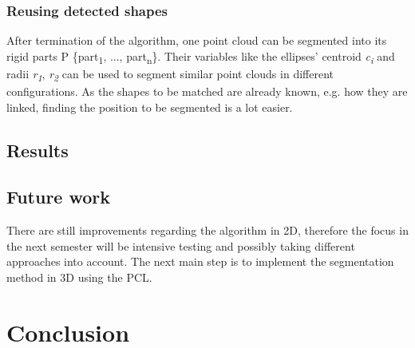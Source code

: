 \documentclass[a4paper,english,11pt]{report}
\begin{document}
\subsection{Reusing detected shapes}

After termination of the algorithm, one point cloud can be segmented into its rigid parts P \{part\textsubscript{1}, ..., part\textsubscript{n}\}. Their variables like the ellipses' centroid \textit{c\textsubscript{i}} and radii \textit{r\textsubscript{1}}, \textit{r\textsubscript{2}} can be used to segment similar point clouds in different configurations. As the shapes to be matched are already known, e.g. how they are linked, finding the position to be segmented is a lot easier.

\section{Results}

\section{Future work}

There are still improvements regarding the algorithm in 2D, therefore the focus in the next semester will be intensive testing and possibly taking different approaches into account. The next main step is to implement the segmentation method in 3D using the PCL. 





\chapter{Conclusion}



\MakeBibliography[nosplit]
\end{document}
